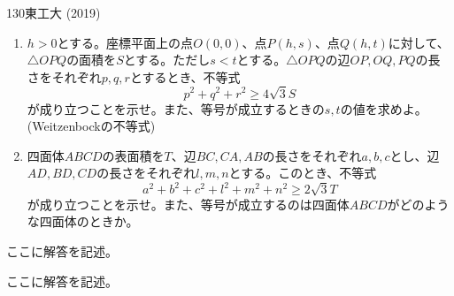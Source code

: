 \begin{prob}{130}{}{東工大 (2019)}
 \begin{enumerate}
  \item $h>0$とする。座標平面上の点$O(0,0)$、点$P(h,s)$、点$Q(h,t)$に対して、$\triangle{OPQ}$の面積を$S$とする。ただし$s<t$とする。$\triangle{OPQ}$の辺$OP, OQ, PQ$の長さをそれぞれ$p, q, r$とするとき、不等式
	\[ p^2+q^2+r^2\ge 4\sqrt{3}S \]
	が成り立つことを示せ。また、等号が成立するときの$s, t$の値を求めよ。 (Weitzenbockの不等式)
  \item 四面体$ABCD$の表面積を$T$、辺$BC, CA, AB$の長さをそれぞれ$a, b, c$とし、辺$AD, BD, CD$の長さをそれぞれ$l, m, n$とする。このとき、不等式
	\[a^2+b^2+c^2+l^2+m^2+n^2 \ge 2\sqrt{3}T \]
	が成り立つことを示せ。また、等号が成立するのは四面体$ABCD$がどのような四面体のときか。
 \end{enumerate}
\end{prob}
ここに解答を記述。

ここに解答を記述。